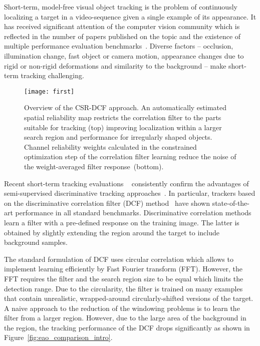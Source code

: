 \documentclass[twocolumn]{article}
\begin{document}
Short-term, model-free visual object tracking is the problem of continuously localizing a target in a video-sequence given a single example of its appearance. It has received
significant attention of the computer vision community which is reflected in the number of papers published on the topic and the existence of multiple performance evaluation benchmarks~\citep{otb_cvpr2010,kristan_vot2013,kristan_vot2014,kristan_vot2015,kristan_vot_tpami2016,templecolor_tip2015,alov_pami2014,uav_benchmark_eccv2016}. Diverse factors -- occlusion,  illumination change, fast object or camera motion, appearance changes due to rigid or non-rigid deformations and similarity to the background -- make short-term tracking challenging.

\begin{figure}[!t]
\centering
\texttt{[image: first]}
\caption{Overview of the CSR-DCF approach. An automatically estimated spatial reliability map restricts the correlation filter to the parts suitable for tracking (top) improving localization within a larger search region and performance for irregularly shaped objects. Channel reliability weights calculated in the constrained optimization step of
the correlation filter learning reduce the noise of the weight-averaged filter response~(bottom).}
\label{fig:filter_comparison}
\end{figure}

Recent short-term tracking evaluations ~\citep{otb_cvpr2010,kristan_vot2013,kristan_vot2014,kristan_vot2015} consistently confirm the advantages of semi-supervised discriminative tracking approaches~\citep{grabner_oab,babenko_mil,hare_struck,bolme2010visual}. In particular, trackers based on the discriminative correlation filter (DCF) method~\citep{bolme2010visual,danelljan2014accurate,henriques2015tracking,samf_eccv2014,srdcf_iccv2015} have shown state-of-the-art performance in all standard benchmarks. Discriminative correlation methods learn a filter with a pre-defined response on the training image. The latter is obtained by slightly extending the region around the target to include background samples.

The standard formulation of DCF uses circular correlation which allows to implement learning efficiently by Fast Fourier transform (FFT). However, the FFT requires the filter and the search region size to be equal which limits the detection range. Due to the circularity, the filter is trained on many examples that contain unrealistic, wrapped-around circularly-shifted versions of the target. 
A naive approach to the reduction of the windowing problems is to learn the filter from a larger region. However, due to the large area of the background in the region, the tracking performance of the DCF drops significantly as shown in Figure~\ref{fig:eao_comparison_intro}.
\end{document}
